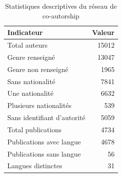 \begin{table}
\caption{Statistiques descriptives du réseau de co-autorship}
\label{tab:descriptive_stats}
\begin{tabular}{lr}
\toprule
Indicateur & Valeur \\
\midrule
Total auteurs & 15012 \\
Genre renseigné & 13047 \\
Genre non renseigné & 1965 \\
Sans nationalité & 7841 \\
Une nationalité & 6632 \\
Plusieurs nationalités & 539 \\
Sans identifiant d'autorité & 5059 \\
Total publications & 4734 \\
Publications avec langue & 4678 \\
Publications sans langue & 56 \\
Langues distinctes & 31 \\
\bottomrule
\end{tabular}
\end{table}
